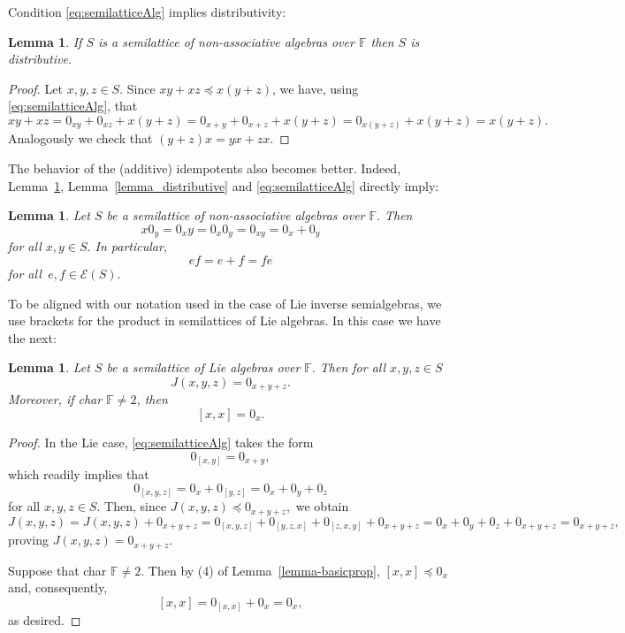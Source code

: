 \documentclass[10pt,a4paper]{amsart}
\newtheorem{lem}[thm]{Lemma}
\theoremstyle{definition}
\newtheorem{defn}[thm]{Definition}
\theoremstyle{remark}
\numberwithin{equation}{section}
\newtheorem*{Theorem A}{\textbf{Theorem A}}
\newtheorem*{Corollary E}{\textbf{Corollary E}}
\newtheorem*{Corollary F}{\textbf{Corollary F}}
\newtheorem*{Theorem B}{\textbf{Theorem B}}
\newtheorem*{Theorem C}{\textbf{Theorem C}}
\newtheorem*{Theorem D}{\textbf{Theorem B}}
\newtheorem*{p a}{\textbf{Proof of  Theorem A}}
\newtheorem*{p b}{\textbf{Proof of Theorem B}}
\newtheorem*{p c}{\textbf{Proof of  Theorem C}}
\newtheorem*{p d}{\textbf{Proof of  Theorem D}}
\newcommand{\E}{\mathcal{E}}
\newcommand{\F}{\mathbb{F}}
\newcommand{\0}{{\vartheta}}
\begin{document}
Condition \eqref{eq:semilatticeAlg} implies distributivity:

\begin{lem}\label{lemma1_SemilatticeAlg}
If $S$ is a semilattice of non-associative algebras over
$\F$ then $S$ is distributive. 
 \end{lem}
 \begin{proof}
  Let $x,y,z\in S.$ Since $xy+xz\preceq x(y+z)$,  we have, using \eqref{eq:semilatticeAlg}, that $$xy+xz= 0_{xy}+0_{xz}+x(y+z)=0_{x+y}+ 0_{x+z}+x(y+z)= 0_{x(y+z)}+ x(y+z)=x(y+z).$$ 
Analogously we check that $(y+z)x=yx+zx.$
\end{proof}

The behavior of the (additive) idempotents also becomes better. Indeed,  Lemma~\ref{lemma1_SemilatticeAlg}, Lemma~\ref{lemma_distributive} and \eqref{eq:semilatticeAlg} directly imply:

\begin{lem}\label{lemma2_SemilatticeAlg} 
Let $S$ be a semilattice of non-associative algebras over
$\F .$ Then 
$$ x 0_y = 0_x y = 0_x 0_y = 0_{xy} = 0_x + 0_y$$  
for all $ x,y \in S.$ In particular, 
$$ef=e+f = fe $$ 
for all $\, e,f \in \E (S).$
     \end{lem}



To be aligned with our notation  used in the case of Lie inverse semialgebras, we use brackets for the product in semilattices of Lie algebras.  In this case we have the next:
\begin{lem}\label{lemma_SemilatticeLieAlg} Let $S$ be a semilattice of Lie algebras over  $\F .$ Then for all $x, y , z\in S$
    $$  J(x,y,z) = 0_{x+y+z}. $$
    Moreover,  if {\rm char} $ \F \neq 2$, then 
    $$[x,x] = 0_x .$$
\end{lem}
\begin{proof} In the Lie case, \eqref{eq:semilatticeAlg} takes the form $$0_{[x,y]} = 0_{x + y},$$ which readily implies that 
    $$0_{[x,y,z]} =  0_{x} +0_{[y,z]} =0_{x} +0_y + 0_z $$ for all $x,y, z\in S.$ Then, since 
    $J(x,y,z)\preceq 0_{x+y+z},$ we obtain
$$J(x,y,z) = J(x,y,z) + 0_{x+y+z}=
0_{[x,y,z]} + 0_{[y,z,x]}+0_{[z,x,y]} + 0_{x+y+z}
=0_{x} +0_y + 0_z  + 0_{x+y+z} = 0_{x+y+z},$$
proving   $J(x,y,z) = 0_{x+y+z}.$ 

Suppose that  {\rm char} $ \F \neq 2 .$ Then by  (4) of Lemma~\ref{lemma-basicprop}, $[x,x] \preceq 0_x $ and, consequently,  
$$[x,x] = 0_{[x,x]} + 0_x  = 0_x,$$ as desired.
\end{proof}
\end{document}
